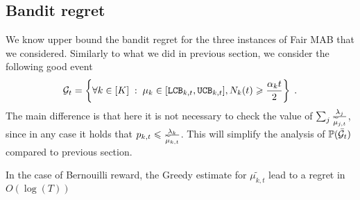 \subsection{Bandit regret}

We know upper bound the bandit regret for the three instances of Fair MAB that we considered. Similarly to what we did in previous section, we consider the following good event
 \[\mathcal{G}_t=\left\{ \forall k \in [K]\;:\; \mu_k \in [\texttt{LCB}_{k, t}, \texttt{UCB}_{k, t}], N_k(t)\geqslant \frac{\alpha_k t}{2} \right\}\;.\]
 The main difference is that here it is not necessary to check the value of $\sum_j \frac{\lambda_j}{\widetilde{\mu}_{j,t}}$, since in any case it holds that $p_{k,t}\leqslant \frac{\lambda_k}{\widetilde{\mu}_{k,t}}$. This will simplify the analysis of $\mathbb{P}(\bar {\mathcal{G}}_t)$ compared to previous section.

\begin{lemma}
	In the case of Bernouilli reward, the Greedy estimate for $\widetilde{\mu_{k, t}}$ lead to a regret in $O(\log(T))$
\end{lemma}
